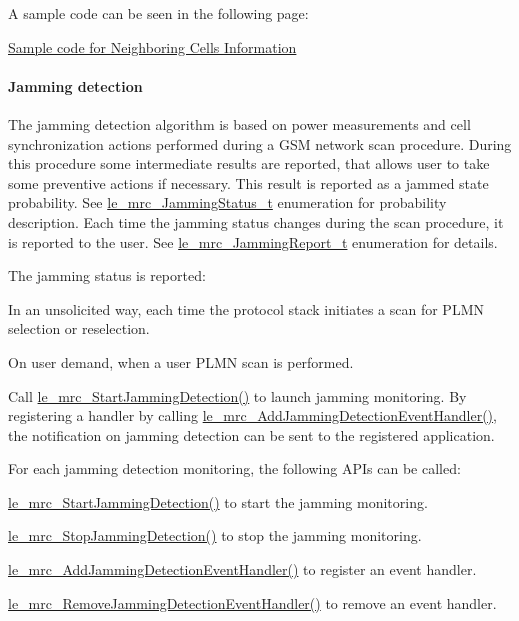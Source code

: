 A sample code can be seen in the following page\+:
\begin{DoxyItemize}
\item \hyperlink{c_mrcNeighborCells}{Sample code for Neighboring Cells Information}
\end{DoxyItemize}\hypertarget{c_mrc_le_mrc_jamming}{}\paragraph{Jamming detection}\label{c_mrc_le_mrc_jamming}
The jamming detection algorithm is based on power measurements and cell synchronization actions performed during a G\+SM network scan procedure. During this procedure some intermediate results are reported, that allows user to take some preventive actions if necessary. This result is reported as a jammed state probability. See \hyperlink{le__mrc__interface_8h_ac55bd8f71baee81d0021cc48f8ca0e09}{le\+\_\+mrc\+\_\+\+Jamming\+Status\+\_\+t} enumeration for probability description. Each time the jamming status changes during the scan procedure, it is reported to the user. See \hyperlink{le__mrc__interface_8h_a06440780b5eeaeed66051e5c81ff20df}{le\+\_\+mrc\+\_\+\+Jamming\+Report\+\_\+t} enumeration for details.

The jamming status is reported\+:
\begin{DoxyItemize}
\item In an unsolicited way, each time the protocol stack initiates a scan for P\+L\+MN selection or reselection.
\item On user demand, when a user P\+L\+MN scan is performed.
\end{DoxyItemize}

Call \hyperlink{le__mrc__interface_8h_ab1876d046a3aff763a2159da29f0481c}{le\+\_\+mrc\+\_\+\+Start\+Jamming\+Detection()} to launch jamming monitoring. By registering a handler by calling \hyperlink{le__mrc__interface_8h_a191db5e4637e5307db7ee10104128867}{le\+\_\+mrc\+\_\+\+Add\+Jamming\+Detection\+Event\+Handler()}, the notification on jamming detection can be sent to the registered application.

For each jamming detection monitoring, the following A\+P\+Is can be called\+:
\begin{DoxyItemize}
\item \hyperlink{le__mrc__interface_8h_ab1876d046a3aff763a2159da29f0481c}{le\+\_\+mrc\+\_\+\+Start\+Jamming\+Detection()} to start the jamming monitoring.
\item \hyperlink{le__mrc__interface_8h_a8cd71575d2d253e5b829bd120a70c491}{le\+\_\+mrc\+\_\+\+Stop\+Jamming\+Detection()} to stop the jamming monitoring.
\item \hyperlink{le__mrc__interface_8h_a191db5e4637e5307db7ee10104128867}{le\+\_\+mrc\+\_\+\+Add\+Jamming\+Detection\+Event\+Handler()} to register an event handler.
\item \hyperlink{le__mrc__interface_8h_a68746d5c30c0102321e7e922bd9375cd}{le\+\_\+mrc\+\_\+\+Remove\+Jamming\+Detection\+Event\+Handler()} to remove an event handler.
\end{DoxyItemize}





